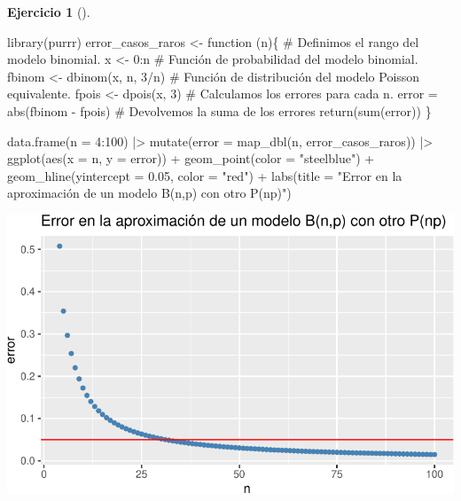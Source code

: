 \documentclass[
  a4paper,
]{scrreport}
\newenvironment{Shaded}{\begin{snugshade}}{\end{snugshade}}
\newcommand{\AttributeTok}[1]{\textcolor[rgb]{0.40,0.45,0.13}{#1}}
\newcommand{\CommentTok}[1]{\textcolor[rgb]{0.37,0.37,0.37}{#1}}
\newcommand{\ControlFlowTok}[1]{\textcolor[rgb]{0.00,0.23,0.31}{#1}}
\newcommand{\DecValTok}[1]{\textcolor[rgb]{0.68,0.00,0.00}{#1}}
\newcommand{\FloatTok}[1]{\textcolor[rgb]{0.68,0.00,0.00}{#1}}
\newcommand{\FunctionTok}[1]{\textcolor[rgb]{0.28,0.35,0.67}{#1}}
\newcommand{\NormalTok}[1]{\textcolor[rgb]{0.00,0.23,0.31}{#1}}
\newcommand{\OtherTok}[1]{\textcolor[rgb]{0.00,0.23,0.31}{#1}}
\newcommand{\SpecialCharTok}[1]{\textcolor[rgb]{0.37,0.37,0.37}{#1}}
\newcommand{\StringTok}[1]{\textcolor[rgb]{0.13,0.47,0.30}{#1}}
\theoremstyle{definition}
\newtheorem{exercise}{Ejercicio}[chapter]
\theoremstyle{remark}
\begin{document}
\begin{exercise}[]
\begin{enumerate}
\begin{tcolorbox}
\begin{Shaded}
\begin{Highlighting}[]
\FunctionTok{library}\NormalTok{(purrr)}
\NormalTok{error\_casos\_raros }\OtherTok{\textless{}{-}} \ControlFlowTok{function}\NormalTok{ (n)\{}
    \CommentTok{\# Definimos el rango del modelo binomial.}
\NormalTok{    x }\OtherTok{\textless{}{-}} \DecValTok{0}\SpecialCharTok{:}\NormalTok{n}
    \CommentTok{\# Función de probabilidad del modelo binomial.}
\NormalTok{    fbinom }\OtherTok{\textless{}{-}} \FunctionTok{dbinom}\NormalTok{(x, n, }\DecValTok{3}\SpecialCharTok{/}\NormalTok{n)}
    \CommentTok{\# Función de distribución del modelo Poisson equivalente.}
\NormalTok{    fpois }\OtherTok{\textless{}{-}} \FunctionTok{dpois}\NormalTok{(x, }\DecValTok{3}\NormalTok{)}
    \CommentTok{\# Calculamos los errores para cada n.}
\NormalTok{    error }\OtherTok{=} \FunctionTok{abs}\NormalTok{(fbinom }\SpecialCharTok{{-}}\NormalTok{ fpois)}
    \CommentTok{\# Devolvemos la suma de los errores}
    \FunctionTok{return}\NormalTok{(}\FunctionTok{sum}\NormalTok{(error))}
\NormalTok{\}}

\FunctionTok{data.frame}\NormalTok{(}\AttributeTok{n =} \DecValTok{4}\SpecialCharTok{:}\DecValTok{100}\NormalTok{)  }\SpecialCharTok{|\textgreater{}} 
    \FunctionTok{mutate}\NormalTok{(}\AttributeTok{error =} \FunctionTok{map\_dbl}\NormalTok{(n, error\_casos\_raros))  }\SpecialCharTok{|\textgreater{}} 
    \FunctionTok{ggplot}\NormalTok{(}\FunctionTok{aes}\NormalTok{(}\AttributeTok{x =}\NormalTok{ n, }\AttributeTok{y =}\NormalTok{ error)) }\SpecialCharTok{+}
    \FunctionTok{geom\_point}\NormalTok{(}\AttributeTok{color =} \StringTok{"steelblue"}\NormalTok{) }\SpecialCharTok{+}
    \FunctionTok{geom\_hline}\NormalTok{(}\AttributeTok{yintercept =} \FloatTok{0.05}\NormalTok{, }\AttributeTok{color =} \StringTok{"red"}\NormalTok{) }\SpecialCharTok{+}
    \FunctionTok{labs}\NormalTok{(}\AttributeTok{title =} \StringTok{"Error en la aproximación de un modelo B(n,p) con otro P(np)"}\NormalTok{)}
\end{Highlighting}
\end{Shaded}

  \includegraphics{06-distribuciones-probabilidad_files/figure-pdf/unnamed-chunk-19-1.pdf}


\end{tcolorbox}
\end{enumerate}
\end{exercise}
\end{document}
